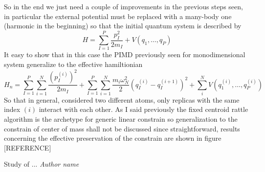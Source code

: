 \documentclass[10pt,a4paper]{article}
\begin{document}
So in the end we just need a couple of improvements in the previous steps seen, in particular the external potential must be replaced with a many-body one (harmonic in the beginning) so that the initial quantum system is described by
\[H=\sum_{I=1}^P \frac{p_I^2}{2m_I}+V(q_1, \dots,q_P)  \]
It easy to show that in this case the PIMD previously seen for monodimensional system generalize to the effective hamiltionian
\[H_n= \sum_{I=1}^P\sum_{i=1}^N \frac{(p_{I}^{(i)})^2}{2m_I} + \sum_{I=1}^P\sum_{i=1}^N\frac{m_i\omega_N^2}{2}(q_{I}^{(i)}-q_{I}^{(i+1)})^2 + \sum_i^N V(q_1^{(i)}, \dots,q_P^{(i)}) \]
So that in general, considered two different atoms, only replicas with the same index $(i)$ interact with each other.
As I said previously the fixed centroid rattle algorithm is the archetype for generic linear constrain so generalization to the constrain of center of mass shall not be discussed since straightforward, results concerning the effective preservation of the constrain are shown in figure [REFERENCE]
\begin{thebibliography}{99}
	\begin{sloppypar}
		 Study of ...
		{\em Author name}
	\end{sloppypar}
\end{thebibliography}
\end{document}
